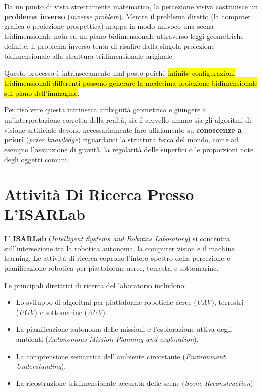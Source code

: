 ﻿\documentclass[11pt, a4paper]{article}
\begin{document}

Da un punto di vista strettamente matematico, la percezione visiva costituisce un \textbf{problema inverso} (\emph{inverse problem}). Mentre il problema diretto (la computer grafica o proiezione prospettica) mappa in modo univoco una scena tridimensionale nota su un piano bidimensionale attraverso leggi geometriche definite, il problema inverso tenta di risalire dalla singola proiezione bidimensionale alla struttura tridimensionale originale.

Questo processo è intrinsecamente mal posto poiché \hl{infinite configurazioni tridimensionali differenti possono generare la medesima proiezione bidimensionale sul piano dell'immagine}.


Per risolvere questa intrinseca ambiguità geometrica e giungere a un'interpretazione corretta della realtà, sia il cervello umano sia gli algoritmi di visione artificiale devono necessariamente fare affidamento su \textbf{conoscenze a priori} (\emph{prior knowledge}) riguardanti la struttura fisica del mondo, come ad esempio l'assunzione di gravità, la regolarità delle superfici o le proporzioni note degli oggetti comuni.

\newpage

\section{Attività Di Ricerca Presso L'ISARLab}

L' \textbf{ISARLab} (\emph{Intelligent Systems and Robotics Laboratory}) si concentra sull'intersezione tra la robotica autonoma, la computer vision e il machine learning. Le attività di ricerca coprono l'intero spettro della percezione e pianificazione robotica per piattaforme aeree, terrestri e sottomarine.


Le principali direttrici di ricerca del laboratorio includono:
\begin{itemize}[noitemsep]
    \item Lo sviluppo di algoritmi per piattaforme robotiche aeree (\emph{UAV}), terrestri (\emph{UGV}) e sottomarine (\emph{AUV}).
    \item La pianificazione autonoma delle missioni e l'esplorazione attiva degli ambienti (\emph{Autonomous Mission Planning and exploration}).
    \item La comprensione semantica dell'ambiente circostante (\emph{Environment Understanding}).
    \item La ricostruzione tridimensionale accurata delle scene (\emph{Scene Reconstruction}).
\end{itemize}
\end{document}
